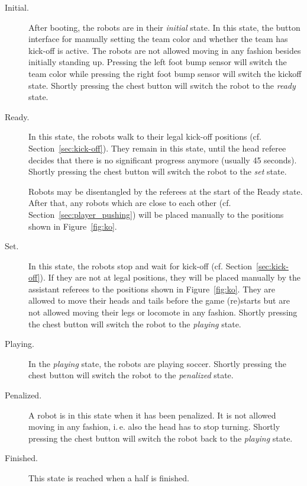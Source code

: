 \documentclass[12pt]{article}
\newcommand{\ie}{\mbox{i.\,e.}\xspace}
\newcommand{\eg}{\mbox{e.\,g.}\xspace}
\newcommand{\cf}{\mbox{cf.}\xspace}
\begin{document}
\begin{description}

\item[Initial.] After booting, the robots are in their \emph{initial} state. In this state, the button interface for manually setting the team color and whether the team has kick-off is active. The robots are not allowed moving in any fashion besides initially standing up. Pressing the left foot bump sensor will switch the team color while pressing the right foot bump sensor will switch the kickoff state. Shortly pressing the chest button will switch the robot to the \emph{ready} state.



\item[Ready.] In this state, the robots walk to their legal kick-off positions (\cf Section~\ref{sec:kick-off}). They remain in this state, until the head referee decides that there is no significant progress anymore (usually 45 seconds). Shortly pressing the chest button will switch the robot to the \emph{set} state.%

Robots may be disentangled by the referees at the start of the Ready state.  After that, any robots which are close to each other (\cf Section~\ref{sec:player_pushing}) will be placed manually to the positions shown in Figure~\ref{fig:ko}.

\item[Set.] In this state, the robots stop and wait for kick-off (\cf Section~\ref{sec:kick-off}). If they are not at legal positions, they will be placed manually by the assistant referees to the positions shown in Figure~\ref{fig:ko}. They are allowed to move their heads and tails before the game (re)starts but are not allowed moving their legs or locomote in any fashion. Shortly pressing the chest button will switch the robot to the \emph{playing} state.


\item[Playing.] In the \emph{playing} state, the robots are playing soccer. Shortly pressing the chest button will switch the robot to the \emph{penalized} state.%
\item[Penalized.] A robot is in this state when it has been penalized. It is not allowed moving in any fashion, \ie also the head has to stop turning. Shortly pressing the chest button will switch the robot back to the \emph{playing} state.
\item[Finished.] This state is reached when a half is finished.
\end{description}
\end{document}

